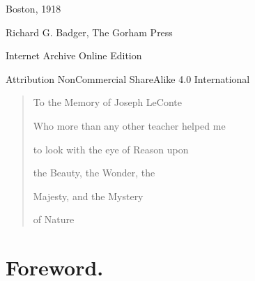 \documentclass[a4paper, 11pt, oneside, polutonikogreek, english]{article}
\begin{document}
\begin{titlepage}
		
	\vspace*{\fill}%
	
	{Boston, 1918} %
 
        {\small Richard G. Badger, The Gorham Press}

	\vspace{1\baselineskip} %

        Internet Archive Online Edition  %
	
	{\small Attribution NonCommercial ShareAlike 4.0 International } %
\end{titlepage}
\clearpage
\setlength{\parskip}{1mm plus1mm minus1mm}
\tableofcontents
\clearpage
\vspace*{\fill}
\begin{quotation}
\begin{center}
To the Memory of Joseph LeConte

Who more than any other teacher helped me

to look with the eye of Reason upon

the Beauty, the Wonder, the

Majesty, and the Mystery

of Nature
\end{center}
\end{quotation}
\vspace*{\fill}
\clearpage
\section*{Foreword.}
\end{document}
